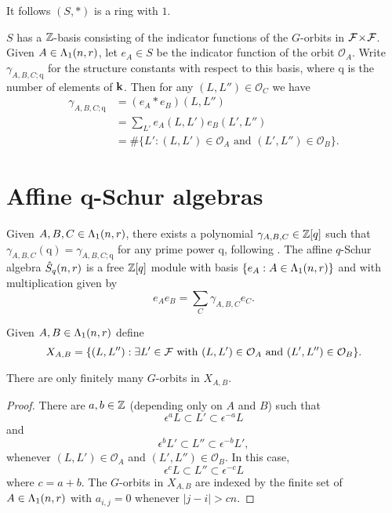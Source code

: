 \documentclass[a4paper, 11pt]{report}
\begin{document}
It follows $(S,\ast)$ is a ring with $1$.

$S$ has a $\mathbb{Z}$-basis consisting of the indicator functions of the $G$-orbits in ${\mathcal{F}\!\times\!\mathcal{F}}$. Given $A\in\Lambda_1(n,r)$, let $e_A\in S$ be the indicator function of the orbit $\mathcal{O}_A$. Write $\gamma_{A,B,C;\mathrm{q}}$ for the structure constants with respect to this basis, where $\mathrm{q}$ is the number of elements of $\mathbf{k}$. Then for any $(L,L'')\in\mathcal{O}_C$ we have
\begin{align*}
\gamma_{A,B,C;\mathrm{q}}
&=(e_A\ast e_B)(L,L'')\\
&= \sum_{L'} e_A(L,L')e_B(L',L'')\\
&= \#\{L':(L,L')\in\mathcal{O}_A \text{ and }(L',L'')\in\mathcal{O}_B\}.
\end{align*}

\section{Affine q-Schur algebras}

Given $A,B,C\in\Lambda_1(n,r)$, there exists a polynomial $\gamma_{A,B,C}\in\mathbb{Z}[q]$ such that $\gamma_{A,B,C}(\mathrm{q}) = \gamma_{A,B,C;\mathrm{q}}$ for any prime power $\mathrm{q}$, following \cite{lusztig99}. The affine $q$-Schur algebra $\hat{S}_q(n,r)$ is a free $\mathbb{Z}[q]$ module with basis $\{e_A:A\in\Lambda_1(n,r)\}$ and with multiplication given by
\begin{equation*}
e_A e_B = \sum_{C} \gamma_{A,B,C}e_C.
\end{equation*}

Given $A,B\in\Lambda_1(n,r)$ define
\begin{equation*}
X_{A,B} = \{(L,L''):\exists L'\in\mathcal{F}\text{ with } (L,L')\in\mathcal{O}_A \text{ and } (L',L'')\in\mathcal{O}_B\}.
\end{equation*}

\begin{observation}
There are only finitely many $G$-orbits in $X_{A,B}$.
\end{observation}

{\color{gray}
\begin{proof}
There are $a,b\in\mathbb{Z}$ (depending only on $A$ and $B$) such that
\begin{equation*}
\epsilon^aL \subset L'\subset \epsilon^{-a}L
\end{equation*}
and
\begin{equation*}
\epsilon^bL' \subset L''\subset \epsilon^{-b}L',
\end{equation*}
whenever $(L,L')\in\mathcal{O}_A$ and $(L',L'')\in\mathcal{O}_B$. In this case,
\begin{equation*}
\epsilon^cL \subset L''\subset \epsilon^{-c}L
\end{equation*}
where $c=a+b$. The $G$-orbits in $X_{A,B}$ are indexed by the finite set of $A\in\Lambda_1(n,r)$ with $a_{i,j}=0$ whenever $|j-i|>cn$.
\end{proof}
}
\end{document}
